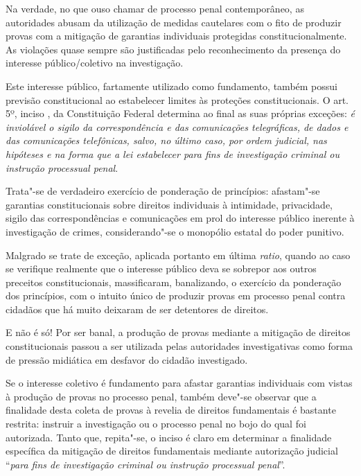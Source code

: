 Na verdade, no que ouso chamar de processo penal contemporâneo, as
autoridades abusam da utilização de medidas cautelares com o fito de
produzir provas com a mitigação de garantias individuais protegidas
constitucionalmente. As violações quase sempre são justificadas pelo
reconhecimento da presença do interesse público/coletivo na
investigação.

Este interesse público, fartamente utilizado como fundamento, também
possui previsão constitucional ao estabelecer limites às proteções
constitucionais. O art. 5º, inciso , da Constituição Federal
determina ao final as suas próprias exceções: \emph{é inviolável o
sigilo da correspondência e das comunicações telegráficas, de dados e
das comunicações telefônicas, salvo, no último caso, por ordem judicial,
nas hipóteses e na forma que a lei estabelecer para fins de investigação
criminal ou instrução processual penal}.

Trata"-se de verdadeiro exercício de ponderação de princípios: afastam"-se
garantias constitucionais sobre direitos individuais à intimidade,
privacidade, sigilo das correspondências e comunicações em prol do
interesse público inerente à investigação de crimes, considerando"-se o
monopólio estatal do poder punitivo.

Malgrado se trate de exceção, aplicada portanto em última \emph{ratio},
quando ao caso se verifique realmente que o interesse público deva se
sobrepor aos outros preceitos constitucionais, massificaram,
banalizando, o exercício da ponderação dos princípios, com o intuito
único de produzir provas em processo penal contra cidadãos que há muito
deixaram de ser detentores de direitos.

E não é só! Por ser banal, a produção de provas mediante a mitigação de
direitos constitucionais passou a ser utilizada pelas autoridades
investigativas como forma de pressão midiática em desfavor do cidadão
investigado.

Se o interesse coletivo é fundamento para afastar garantias individuais
com vistas à produção de provas no processo penal, também deve"-se
observar que a finalidade desta coleta de provas à revelia de direitos
fundamentais é bastante restrita: instruir a investigação ou o processo
penal no bojo do qual foi autorizada. Tanto que, repita"-se, o inciso 
é claro em determinar a finalidade específica da mitigação de direitos
fundamentais mediante autorização judicial ``\emph{para fins de
investigação criminal ou instrução processual penal}''.

